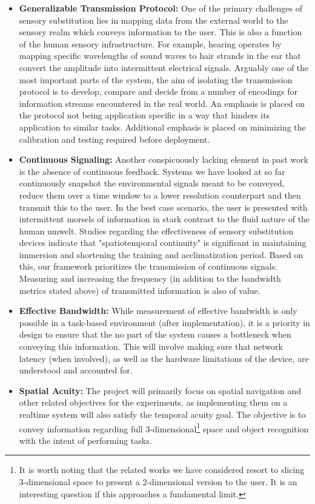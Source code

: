\documentclass[
hidelinks,
12pt, %
oneside, %
english, %
doublespacing, %
headsepline, %
]{MastersDoctoralThesis} %
\begin{document}
\begin{itemize}
\item \textbf{Generalizable Transmission Protocol:} One of the primary challenges of sensory substitution lies in mapping data from the external world to the sensory realm which conveys information to the user. This is also a function of the human sensory infrastructure. For example, hearing operates by mapping specific wavelengths of sound waves to hair strands in the ear that convert the amplitude into intermittent electrical signals. Arguably one of the most important parts of the system, the aim of isolating the transmission protocol is to develop, compare and decide from a number of encodings for information streams encountered in the real world. An emphasis is placed on the protocol not being application specific in a way that hinders its application to similar tasks. Additional emphasis is placed on minimizing the calibration and testing required before deployment.
\item \textbf{Continuous Signaling:} Another conspicuously lacking element in past work is the absence of continuous feedback. Systems we have looked at so far continuously snapshot the environmental signals meant to be conveyed, reduce them over a time window to a lower resolution counterpart and then transmit this to the user. In the best case scenario, the user is presented with intermittent morsels of information in stark contrast to the fluid nature of the human umwelt. Studies \parencite{kristjansson_designing_nodate} regarding the effectiveness of sensory substitution devices indicate that "spatiotemporal continuity" is significant in maintaining immersion and shortening the training and acclimatization period. Based on this, our framework prioritizes the transmission of continuous signals. Measuring and increasing the frequency (in addition to the bandwidth metrics stated above) of transmitted information is also of value.
\item \textbf{Effective Bandwidth:} While measurement of effective bandwidth is only possible in a task-based environment (after implementation), it is a priority in design to ensure that the no part of the system causes a bottleneck when conveying this information. This will involve making sure that network latency (when involved), as well as the hardware limitations of the device, are understood and accounted for.
\item \textbf{Spatial Acuity: }The project will primarily focus on spatial navigation and other related objectives for the experiments, as implementing them on a realtime system will also satisfy the temporal acuity goal. The objective is to convey information regarding full 3-dimensional\footnote{It is worth noting that the related works we have considered resort to slicing 3-dimensional space to present a 2-dimensional version to the user. It is an interesting question if this approaches a fundamental limit.} space and object recognition with the intent of performing tasks.

\end{itemize}
\end{document}
